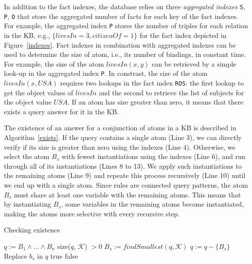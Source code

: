 In addition to the fact indexes, the database relies 
on three \emph{aggregated indexes} \texttt{S}, \texttt{P}, \texttt{O} that store the aggregated number of facts for each
key of the fact indexes. For example, the aggregated index \texttt{P} stores the number of triples for each relation
in the KB, e.g., $\{ livesIn=3, citizenOf=1 \}$ for the fact index depicted in Figure~\ref{indexes}. 
Fact indexes in combination with aggregated indexes can be used to determine the size of atom, i.e., its number of bindings, 
in constant time. For example, the size of the atom $livesIn(x,y)$ can be retrieved by a simple look-up 
in the aggregated index \texttt{P}. In constrast, the size of the atom $livesIn(x, USA)$ requires two 
lookups in the fact index \texttt{ROS}: the first lookup to get the object values of $livesIn$ and the second
to retrieve the list of subjects for the object value $USA$. If an atom has size greater than zero, it means
that there exists a query answer for it in the KB.

The existence of an answer for a conjunction of atoms in a KB is described in Algorithm~\ref{exists}. 
If the query contains a single atom (Line 3), we can directly verify if its size is greater than zero using
the indexes (Line 4). Otherwise, we select the atom $B_s$ with fewest instantiations using the indexes (Line 6), 
and run through all of its instantiations (Lines 8 to 13). We apply such instantiations to the remaining atoms (Line 9)
and repeate this process recursively (Line 10) until we end up with a single atom. Since rules are connected query patterns, the atom $B_s$ must share at least
one variable with the remaining atoms. This means that by instantiating $B_s$, some variables in the remaining atoms 
become instantiated, making the atoms more selective with every recursive step.

\begin{algorithm}
\caption{Checking existence}
\label{exists}
\begin{algorithmic}[1]
    \State $q := B_1 \wedge ... \wedge B_n$
      \State \Return size($q$, $\mathcal{K}$) $> 0$
    \Else
      \State $B_s := findSmallest(q, \mathcal{K})$
      \State $q := q - \{ B_s \} $
	\State Replace $b_s$ in $q$
	    \State \Return true
	  \EndIf
      \EndFor
    \EndIf
    \State \Return false
\EndFunction
\end{algorithmic}
\end{algorithm}


